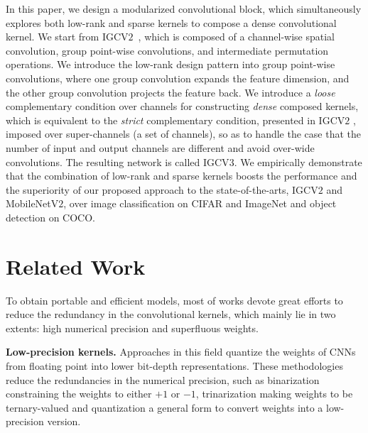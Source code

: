 \documentclass{bmvc2k}
\begin{document}
	In this paper,
	we design a modularized convolutional block,
	which simultaneously explores both low-rank and sparse kernels
	to compose a dense convolutional kernel.
	We start from IGCV$2$~\cite{ISSC18}, 
	which is composed of a channel-wise spatial convolution,
	group point-wise convolutions,
	and intermediate permutation operations.
	We introduce the low-rank design pattern
	into group point-wise convolutions,
	where one group convolution expands the feature dimension,
	and the other group convolution projects the feature back.
	We introduce a \emph{loose} complementary condition over channels for constructing \emph{dense} composed kernels,
	which is equivalent to the \emph{strict} complementary condition, presented in IGCV$2$ \cite{ISSC18},
	imposed over super-channels (a set of channels),
	so as to handle the case
	that the number of input and output channels are different
	and avoid over-wide convolutions.
	The resulting network is called IGCV$3$.
	We empirically demonstrate that the combination of low-rank and sparse kernels boosts the performance
	and the superiority of our proposed approach 
	to the state-of-the-arts, IGCV$2$ and MobileNetV$2$,
	over image classification on CIFAR and ImageNet
	and object detection on COCO.
	
	\section{Related Work}
	
	To obtain portable and efficient models, most of works devote great efforts to reduce the redundancy in the convolutional kernels, which mainly lie in two extents: high numerical precision and superfluous weights.
	
	
	\noindent\textbf{Low-precision kernels.}  
	Approaches in this field quantize the weights of CNNs from floating point into lower bit-depth representations. These methodologies reduce the redundancies in the numerical precision, such as binarization \cite{courbariaux2016binarized} constraining the weights to either $+1$ or $-1$, trinarization \cite{li2016ternary,zhou2016dorefa,zhu2016trained} making weights to be ternary-valued and quantization \cite{HanMD15,zhou2017incremental} a general form to convert weights into a low-precision version.
	
\end{document}
